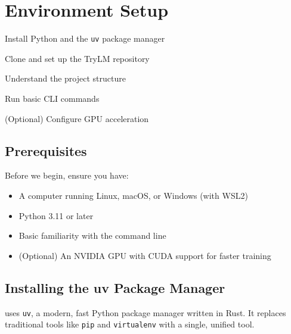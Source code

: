 \chapter{Environment Setup}
\label{ch:environment-setup}

\begin{objectives}
    \item Install Python and the \texttt{uv} package manager
    \item Clone and set up the TryLM repository
    \item Understand the project structure
    \item Run basic CLI commands
    \item (Optional) Configure GPU acceleration
\end{objectives}

\section{Prerequisites}

Before we begin, ensure you have:

\begin{itemize}
    \item A computer running Linux, macOS, or Windows (with WSL2)
    \item Python 3.11 or later
    \item Basic familiarity with the command line
    \item (Optional) An NVIDIA GPU with CUDA support for faster training
\end{itemize}

\section{Installing the uv Package Manager}

\TryLM uses \texttt{uv}, a modern, fast Python package manager written in Rust. It replaces traditional tools like \texttt{pip} and \texttt{virtualenv} with a single, unified tool.

